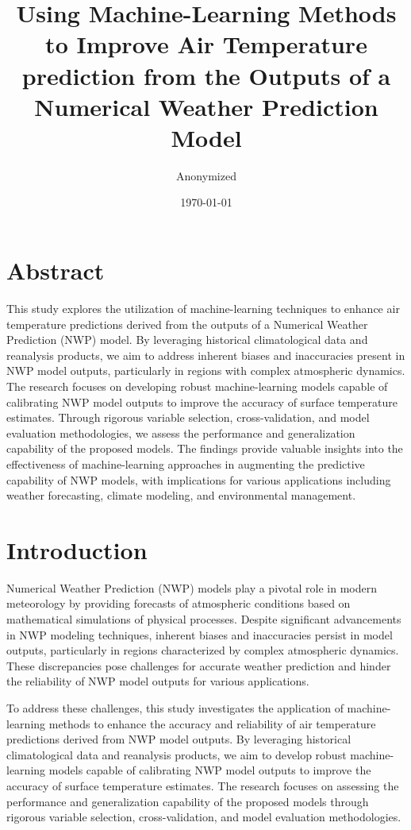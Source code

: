 \documentclass[12pt]{article}
\title{Using Machine-Learning Methods to Improve Air Temperature prediction from the Outputs of a Numerical Weather Prediction
Model}
\date{\today}
\author{Anonymized}
\begin{document}
	
\maketitle
	
\section*{Abstract}

This study explores the utilization of machine-learning techniques to enhance air temperature predictions derived from the outputs of a Numerical Weather Prediction (NWP) model. By leveraging historical climatological data and reanalysis products, we aim to address inherent biases and inaccuracies present in NWP model outputs, particularly in regions with complex atmospheric dynamics. The research focuses on developing robust machine-learning models capable of calibrating NWP model outputs to improve the accuracy of surface temperature estimates. Through rigorous variable selection, cross-validation, and model evaluation methodologies, we assess the performance and generalization capability of the proposed models. The findings provide valuable insights into the effectiveness of machine-learning approaches in augmenting the predictive capability of NWP models, with implications for various applications including weather forecasting, climate modeling, and environmental management.

\section{Introduction}

Numerical Weather Prediction (NWP) models play a pivotal role in modern meteorology by providing forecasts of atmospheric conditions based on mathematical simulations of physical processes. Despite significant advancements in NWP modeling techniques, inherent biases and inaccuracies persist in model outputs, particularly in regions characterized by complex atmospheric dynamics. These discrepancies pose challenges for accurate weather prediction and hinder the reliability of NWP model outputs for various applications.

To address these challenges, this study investigates the application of machine-learning methods to enhance the accuracy and reliability of air temperature predictions derived from NWP model outputs. By leveraging historical climatological data and reanalysis products, we aim to develop robust machine-learning models capable of calibrating NWP model outputs to improve the accuracy of surface temperature estimates. The research focuses on assessing the performance and generalization capability of the proposed models through rigorous variable selection, cross-validation, and model evaluation methodologies.
\end{document}

